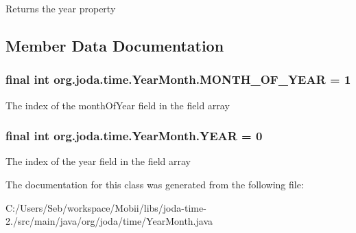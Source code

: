 \begin{DoxyReturn}{Returns}
the year property 
\end{DoxyReturn}


\subsection{Member Data Documentation}
\hypertarget{classorg_1_1joda_1_1time_1_1_year_month_a0df50d28e9947cc550e7e2465cc7c9a0}{
\subsubsection[{M\-O\-N\-T\-H\-\_\-\-O\-F\-\_\-\-Y\-E\-A\-R}]{\setlength{\rightskip}{0pt plus 5cm}final int org.\-joda.\-time.\-Year\-Month.\-M\-O\-N\-T\-H\-\_\-\-O\-F\-\_\-\-Y\-E\-A\-R = 1\hspace{0.3cm}{\ttfamily [static]}}}\label{classorg_1_1joda_1_1time_1_1_year_month_a0df50d28e9947cc550e7e2465cc7c9a0}
The index of the month\-Of\-Year field in the field array \hypertarget{classorg_1_1joda_1_1time_1_1_year_month_a2fdfd0632bd8c9bab64382e4c7c71289}{
\subsubsection[{Y\-E\-A\-R}]{\setlength{\rightskip}{0pt plus 5cm}final int org.\-joda.\-time.\-Year\-Month.\-Y\-E\-A\-R = 0\hspace{0.3cm}{\ttfamily [static]}}}\label{classorg_1_1joda_1_1time_1_1_year_month_a2fdfd0632bd8c9bab64382e4c7c71289}
The index of the year field in the field array 

The documentation for this class was generated from the following file\-:\begin{DoxyCompactItemize}
\item 
C\-:/\-Users/\-Seb/workspace/\-Mobii/libs/joda-\/time-\/2./src/main/java/org/joda/time/Year\-Month.\-java\end{DoxyCompactItemize}
